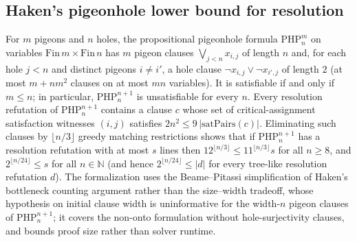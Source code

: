 \begin{result}
\subsection{Haken's pigeonhole lower bound for resolution}
For $m$ pigeons and $n$ holes, the propositional pigeonhole formula $\mathrm{PHP}^m_n$
on variables $\mathrm{Fin}\,m\times\mathrm{Fin}\,n$ has $m$ pigeon clauses
$\bigvee_{j<n} x_{i,j}$ of length $n$ and, for each hole $j<n$ and distinct pigeons
$i\ne i'$, a hole clause $\neg x_{i,j}\vee\neg x_{i',j}$ of length $2$ (at most
$m+nm^2$ clauses on at most $mn$ variables). It is satisfiable if and only if
$m\le n$; in particular, $\mathrm{PHP}^{n+1}_n$ is unsatisfiable for every $n$.
Every resolution refutation of $\mathrm{PHP}^{n+1}_n$ contains a clause $c$ whose
set of critical-assignment satisfaction witnesses $(i,j)$ satisfies
$2n^2\le 9\,|\mathrm{satPairs}(c)|$. Eliminating such clauses by $\lfloor n/3\rfloor$
greedy matching restrictions shows that if $\mathrm{PHP}^{n+1}_n$ has a resolution
refutation with at most $s$ lines then $12^{\lfloor n/3\rfloor}\le 11^{\lfloor n/3\rfloor}s$
for all $n\ge 8$, and $2^{\lfloor n/24\rfloor}\le s$ for all $n\in\mathbb{N}$ (and
hence $2^{\lfloor n/24\rfloor}\le |d|$ for every tree-like resolution refutation $d$).
The formalization uses the Beame--Pitassi simplification of Haken's bottleneck
counting argument rather than the size--width tradeoff, whose hypothesis on initial
clause width is uninformative for the width-$n$ pigeon clauses of $\mathrm{PHP}^{n+1}_n$;
it covers the non-onto formulation without hole-surjectivity clauses, and bounds
proof size rather than solver runtime.
\citep{Haken1985,BeamePitassi1996,Jukna2012}
\end{result}


